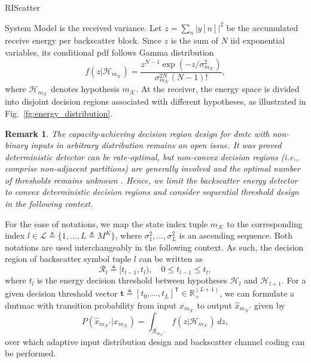 \documentclass[journal]{IEEEtran}
\newtheorem{remark}{Remark}
\begin{document}
\begin{section}{RIScatter}
\begin{subsection}{System Model}
		is the received variance.
		Let $z=\sum_{n} \bigl\lvert y[n] \bigr\rvert^2$ be the accumulated receive energy per backscatter block.
		Since $z$ is the sum of $N$ \gls{iid} exponential variables, its conditional \gls{pdf} follows Gamma distribution
		\begin{equation}
			f(z|\mathcal{H}_{m_{\mathcal{K}}}) = \frac{z^{N-1} \exp(-z/\sigma_{m_{\mathcal{K}}}^2)}{\sigma_{m_{\mathcal{K}}}^{2N} (N-1)!},
			\label{eq:energy_distribution}
		\end{equation}
		where $\mathcal{H}_{m_{\mathcal{K}}}$ denotes hypothesis $m_{\mathcal{K}}$.
		At the receiver, the energy space is divided into disjoint decision regions associated with different hypotheses, as illustrated in Fig.~\ref{fg:energy_distribution}.
		\begin{remark}
			The capacity-achieving decision region design for \gls{dmtc} with non-binary inputs in arbitrary distribution remains an open issue.
			It was proved deterministic detector can be rate-optimal, but non-convex decision regions (i.e., comprise non-adjacent partitions) are generally involved and the optimal number of thresholds remains unknown \cite{Nguyen2018,Nguyen2021}.
			Hence, we limit the backscatter energy detector to convex deterministic decision regions and consider sequential threshold design in the following context.
		\end{remark}

		For the ease of notations, we map the state index tuple $m_{\mathcal{K}}$ to the corresponding index $l \in \mathcal{L} \triangleq \{1,\ldots,L \triangleq M^K\}$, where $\sigma_1^2,\ldots,\sigma_L^2$ is an ascending sequence.
		Both notations are used interchangeably in the following context.
		As such, the decision region of backscatter symbol tuple $l$ can be written as
		\begin{equation}
			\mathcal{R}_{l} \triangleq [t_{l-1},t_l), \quad 0 \le t_{l-1} \le t_l,
		\end{equation}
		where $t_l$ is the energy decision threshold between hypotheses $\mathcal{H}_{l}$ and $\mathcal{H}_{l+1}$.
		For a given decision threshold vector $\boldsymbol{t} \triangleq [t_0,\ldots,t_L]^\mathsf{T} \in \mathbb{R}_+^{(L+1)}$, we can formulate a \gls{dmtmac} with transition probability from input $x_{m_{\mathcal{K}}}$ to output $\hat{x}_{m_{\mathcal{K}}'}$ given by
		\begin{equation}
			P(\hat{x}_{m_{\mathcal{K}}'}|x_{m_{\mathcal{K}}}) = \int_{\mathcal{R}_{m_{\mathcal{K}}'}} f(z|\mathcal{H}_{m_{\mathcal{K}}}) \, d z,
			\label{eq:dmtmac}
		\end{equation}
		over which adaptive input distribution design and backscatter channel coding can be performed.
		\label{st:system_model}
	\end{subsection}


\end{section}
\end{document}
